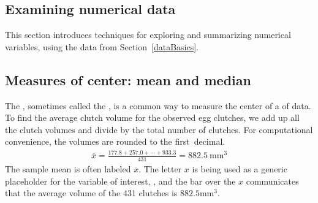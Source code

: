 \begin{doublespace}

\section[Examining numerical data]{Examining numerical data}
\label{numericalData}


This section introduces techniques for exploring and summarizing numerical variables, using the  data from Section~\ref{dataBasics}.

\subsection{Measures of center: mean and median}
\label{measuresOfCenter}

The , sometimes called the , is a common way to measure the center of a  of data. To find the average clutch volume for the observed egg clutches, we add up all the clutch volumes and divide by the total number of clutches. For computational convenience, the volumes are rounded to the first~decimal.
\begin{eqnarray}
\overline{x} = \frac{177.8 + 257.0 + \cdots + 933.3}{431} = 882.5\ \textrm{mm}^{3}
\label{sampleMeanEquation}
\end{eqnarray}
The sample mean is often labeled $\overline{x}$. The letter $x$ is being used as a generic placeholder for the variable of interest, , and the bar over the $x$ communicates that the average volume of the 431 clutches is $882.5\textrm{mm}^{3}$. 



\end{doublespace}

